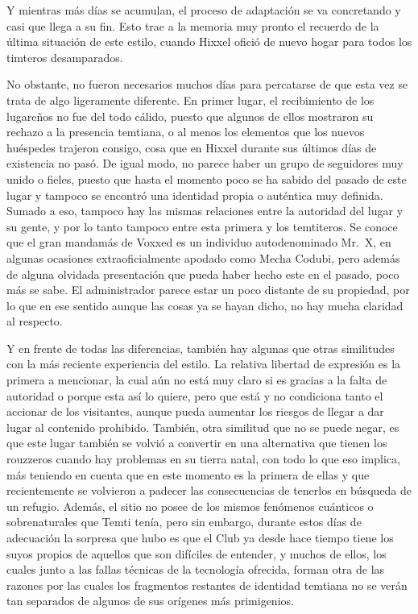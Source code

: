 \documentclass[
  spanish,
]{book}
\begin{document}
Y mientras más días se acumulan, el proceso de adaptación se va concretando y casi que llega a su fin. Esto trae a la memoria muy pronto el recuerdo de la última situación de este estilo, cuando Hixxel ofició de nuevo hogar para todos los timteros desamparados.

No obstante, no fueron necesarios muchos días para percatarse de que esta vez se trata de algo ligeramente diferente. En primer lugar, el recibimiento de los lugareños no fue del todo cálido, puesto que algunos de ellos mostraron su rechazo a la presencia temtiana, o al menos los elementos que los nuevos huéspedes trajeron consigo, cosa que en Hixxel durante sus últimos días de existencia no pasó. De igual modo, no parece haber un grupo de seguidores muy unido o fieles, puesto que hasta el momento poco se ha sabido del pasado de este lugar y tampoco se encontró una identidad propia o auténtica muy definida. Sumado a eso, tampoco hay las mismas relaciones entre la autoridad del lugar y su gente, y por lo tanto tampoco entre esta primera y los temtiteros. Se conoce que el gran mandamás de Voxxed es un individuo autodenominado Mr.~X, en algunas ocasiones extraoficialmente apodado como Mecha Codubi, pero además de alguna olvidada presentación que pueda haber hecho este en el pasado, poco más se sabe. El administrador parece estar un poco distante de su propiedad, por lo que en ese sentido aunque las cosas ya se hayan dicho, no hay mucha claridad al respecto.

Y en frente de todas las diferencias, también hay algunas que otras similitudes con la más reciente experiencia del estilo. La relativa libertad de expresión es la primera a mencionar, la cual aún no está muy claro si es gracias a la falta de autoridad o porque esta así lo quiere, pero que está y no condiciona tanto el accionar de los visitantes, aunque pueda aumentar los riesgos de llegar a dar lugar al contenido prohibido. También, otra similitud que no se puede negar, es que este lugar también se volvió a convertir en una alternativa que tienen los rouzzeros cuando hay problemas en su tierra natal, con todo lo que eso implica, más teniendo en cuenta que en este momento es la primera de ellas y que recientemente se volvieron a padecer las consecuencias de tenerlos en búsqueda de un refugio. Además, el sitio no posee de los mismos fenómenos cuánticos o sobrenaturales que Temti tenía, pero sin embargo, durante estos días de adecuación la sorpresa que hubo es que el Club ya desde hace tiempo tiene los suyos propios de aquellos que son difíciles de entender, y muchos de ellos, los cuales junto a las fallas técnicas de la tecnología ofrecida, forman otra de las razones por las cuales los fragmentos restantes de identidad temtiana no se verán tan separados de algunos de sus orígenes más primigenios.
\end{document}
